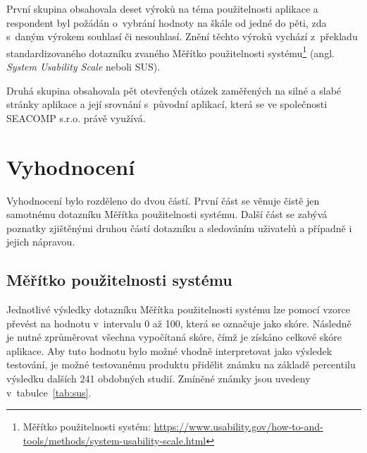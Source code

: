 První skupina obsahovala deset výroků na téma použitelnosti aplikace a respondent byl požádán o~vybrání hodnoty na škále od jedné do pěti, zda s~daným výrokem souhlasí či nesouhlasí. Znění těchto výroků vychází z~překladu standardizovaného dotazníku zvaného Měřítko použitelnosti systému\footnote{Měřítko použitelnosti systém: \url{https://www.usability.gov/how-to-and-tools/methods/system-usability-scale.html}} (angl. \emph{System Usability Scale} neboli SUS).

Druhá skupina obsahovala pět otevřených otázek zaměřených na silné a slabé stránky aplikace a její srovnání s~původní aplikací, která se ve společnosti SEACOMP s.r.o. právě využívá.



\section{Vyhodnocení}
Vyhodnocení bylo rozděleno do dvou částí. První část se věnuje čistě jen samotnému dotazníku Měřítka použitelnosti systému. Další část se zabývá poznatky zjištěnými druhou částí dotazníku a sledováním uživatelů a případně i jejich nápravou.


\subsection{Měřítko použitelnosti systému}
Jednotlivé výsledky dotazníku Měřítka použitelnosti systému lze pomocí vzorce převést na hodnotu v~intervalu 0 až 100, která se označuje jako skóre. Následně je nutné zprůměrovat všechna vypočítaná skóre, čímž je získáno celkové skóre aplikace. Aby tuto hodnotu bylo možné vhodně interpretovat jako výsledek testování, je možné testovanému produktu přidělit známku na základě percentilu výsledku dalších 241 obdobných studií. Zmíněné známky jsou uvedeny v~tabulce~\ref{tab:sus}.

